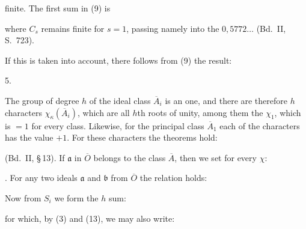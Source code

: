 
finite. The first sum in (9) is


where $C_s$ remains finite for $s = 1$, passing namely into the  $0{,}5772\dots$ (Bd.\ II, S.\ 723).

If this is taken into account, there follows from (9) the result:

5. 



The group of degree $h$ of the ideal class $\overline{A}_i$ is an  one, and there are therefore $h$ characters $\chi_\kappa(\overline{A}_i)$, which are all $h$th roots of unity, among them the  $\chi_1$, which is $= 1$ for every class. Likewise, for the principal class $\overline{A}_1$ each of the characters has the value $+1$. For these characters the theorems hold:


(Bd.\ II, \S\,13). If  $\mathfrak{a}$ in $\overline{O}$ belongs to the class $\overline{A}$, then we set for every $\chi$:


. For any two ideals $\mathfrak{a}$ and $\mathfrak{b}$ from $\overline{O}$ the relation holds:


Now from $S_i$ we form the $h$ sum:


for which, by (3) and (13), we may also write:

